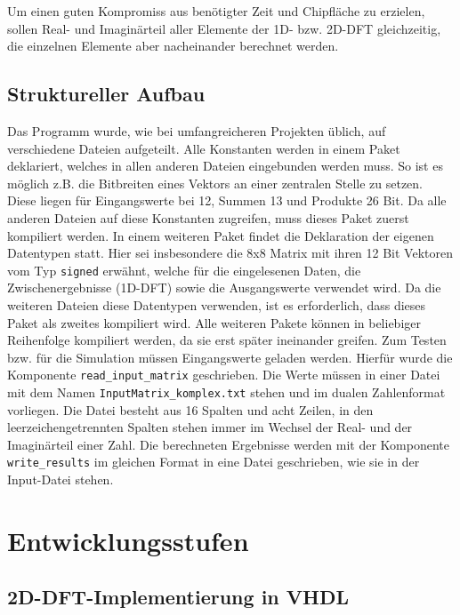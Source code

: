 Um einen guten Kompromiss aus benötigter Zeit und Chipfläche zu erzielen,
sollen  Real- und Imaginärteil aller Elemente der 1D- bzw. 2D-DFT gleichzeitig, die einzelnen Elemente aber nacheinander berechnet werden.



\subsection{Struktureller Aufbau}
 Das Programm wurde, wie bei umfangreicheren Projekten üblich, auf verschiedene Dateien aufgeteilt. Alle Konstanten werden in einem Paket deklariert, welches in allen anderen Dateien
 eingebunden werden muss. So ist es möglich z.B. die Bitbreiten eines Vektors an einer zentralen Stelle zu setzen. Diese liegen für 
 Eingangswerte bei 12, Summen 13 und Produkte 26 Bit. Da alle anderen Dateien auf diese
 Konstanten zugreifen, muss dieses Paket zuerst kompiliert werden. In einem weiteren Paket findet die Deklaration der eigenen Datentypen statt. Hier sei
 insbesondere die 8x8 Matrix mit ihren 12 Bit Vektoren vom Typ \texttt{signed} erwähnt, welche für die eingelesenen 
 Daten, die Zwischenergebnisse (1D-DFT) sowie die Ausgangswerte verwendet wird.
 Da die weiteren Dateien diese Datentypen verwenden, ist es 
 erforderlich, dass dieses Paket als zweites kompiliert wird. Alle weiteren Pakete können in beliebiger Reihenfolge kompiliert werden, da sie erst später ineinander
 greifen. 
 Zum Testen bzw. für die Simulation müssen Eingangswerte geladen werden. Hierfür wurde die Komponente \texttt{read\_input\_matrix} geschrieben. Die Werte müssen
 in einer Datei mit dem Namen \texttt{InputMatrix\_komplex.txt} stehen und im dualen Zahlenformat vorliegen. 
 Die Datei besteht aus 16 Spalten und acht Zeilen, in den leerzeichengetrennten Spalten stehen immer im Wechsel der Real- und der Imaginärteil einer Zahl.
  Die berechneten Ergebnisse werden mit der Komponente \texttt{write\_results} im gleichen Format in eine Datei geschrieben, wie sie in der Input-Datei stehen. 
 



\section{Entwicklungsstufen}

\subsection{2D-DFT-Implementierung in VHDL}

